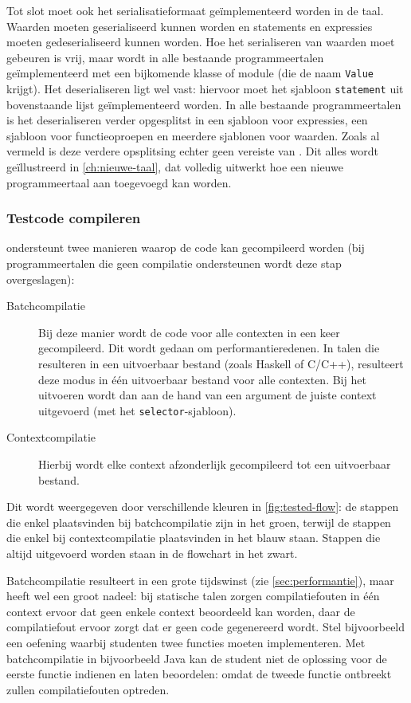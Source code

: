 Tot slot moet ook het serialisatieformaat geïmplementeerd worden in de taal.
Waarden moeten geserialiseerd kunnen worden en statements en expressies moeten gedeserialiseerd kunnen worden.
Hoe het serialiseren van waarden moet gebeuren is vrij, maar wordt in alle bestaande programmeertalen geïmplementeerd met een bijkomende klasse of module (die de naam \texttt{Value} krijgt).
Het deserialiseren ligt wel vast: hiervoor moet het sjabloon \texttt{statement} uit bovenstaande lijst geïmplementeerd worden.
In alle bestaande programmeertalen is het deserialiseren verder opgesplitst in een sjabloon voor expressies, een sjabloon voor functieoproepen en meerdere sjablonen voor waarden.
Zoals al vermeld is deze verdere opsplitsing echter geen vereiste van \tested{}.
Dit alles wordt geïllustreerd in \cref{ch:nieuwe-taal}, dat volledig uitwerkt hoe een nieuwe programmeertaal aan \tested{} toegevoegd kan worden.

\subsubsection{Testcode compileren}

\tested{} ondersteunt twee manieren waarop de code kan gecompileerd worden (bij programmeertalen die geen compilatie ondersteunen wordt deze stap overgeslagen):

\begin{description}
    \item[Batchcompilatie] Bij deze manier wordt de code voor alle contexten in een keer gecompileerd.
    Dit wordt gedaan om performantieredenen.
    In talen die resulteren in een uitvoerbaar bestand (zoals Haskell of C/C++), resulteert deze modus in één uitvoerbaar bestand voor alle contexten.
    Bij het uitvoeren wordt dan aan de hand van een argument de juiste context uitgevoerd (met het \texttt{selector}-sjabloon).
    \item[Contextcompilatie] Hierbij wordt elke context afzonderlijk gecompileerd tot een uitvoerbaar bestand.
\end{description}

Dit wordt weergegeven door verschillende kleuren in \cref{fig:tested-flow}: de stappen die enkel plaatsvinden bij batchcompilatie zijn in het \textcolor{ugent-ps}{groen}, terwijl de stappen die enkel bij contextcompilatie plaatsvinden in het \textcolor{ugent-we}{blauw} staan.
Stappen die altijd uitgevoerd worden staan in de flowchart in het zwart.

Batchcompilatie resulteert in een grote tijdswinst (zie \cref{sec:performantie}), maar heeft wel een groot nadeel: bij statische talen zorgen compilatiefouten in één context ervoor dat geen enkele context beoordeeld kan worden, daar de compilatiefout ervoor zorgt dat er geen code gegenereerd wordt.
Stel bijvoorbeeld een oefening waarbij studenten twee functies moeten implementeren.
Met batchcompilatie in bijvoorbeeld Java kan de student niet de oplossing voor de eerste functie indienen en laten beoordelen: omdat de tweede functie ontbreekt zullen compilatiefouten optreden.

